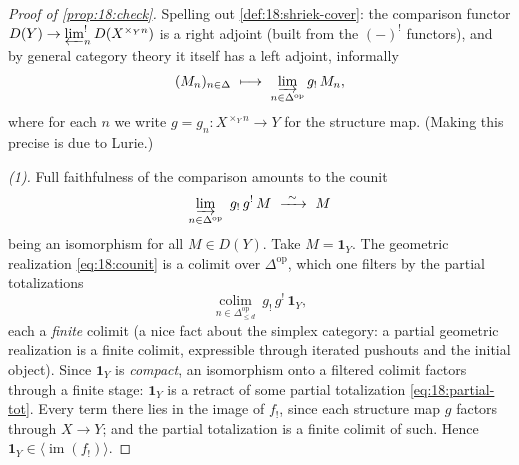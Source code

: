 \begin{proof}[Proof of \cref{prop:18:check}]
Spelling out \cref{def:18:shriek-cover}: the comparison functor
$D(Y)\to\varprojlim^!_{n}D(X^{\times_Y n})$ is a right adjoint (built from the
$(-)^!$ functors), and by general category theory it itself has a left adjoint,
informally
\begin{equation*}
(M_n)_{n\in\Delta}\ \longmapsto\ \varinjlim_{n\in\Delta^{\mathrm{op}}} g_!\,M_n,
\end{equation*}
where for each $n$ we write $g=g_n\colon X^{\times_Y n}\to Y$ for the structure
map. (Making this precise is due to Lurie.)

\emph{(1).} Full faithfulness of the comparison amounts to the counit
\begin{equation}
\label{eq:18:counit}
\varinjlim_{n\in\Delta^{\mathrm{op}}}\ g_!\,g^!\,M\ \xrightarrow{\ \sim\ }\ M
\end{equation}
being an isomorphism for all $M\in D(Y)$. Take $M=\mathbf 1_Y$. The geometric
realization \eqref{eq:18:counit} is a colimit over $\Delta^{\mathrm{op}}$, which one
filters by the partial totalizations
\begin{equation}
\label{eq:18:partial-tot}
\operatorname*{colim}_{n\in\Delta^{\mathrm{op}}_{\le d}}\ g_!\,g^!\,\mathbf 1_Y,
\end{equation}
each a \emph{finite} colimit (a nice fact about the simplex category: a partial
geometric realization is a finite colimit, expressible through iterated pushouts
and the initial object). Since $\mathbf 1_Y$ is \emph{compact}, an isomorphism
onto a filtered colimit factors through a finite stage: $\mathbf 1_Y$ is a retract
of some partial totalization \eqref{eq:18:partial-tot}. Every term there lies in
the image of $f_!$, since each structure map $g$ factors through $X\to Y$; and the
partial totalization is a finite colimit of such. Hence
$\mathbf 1_Y\in\langle\operatorname{im}(f_!)\rangle$.


\end{proof}
